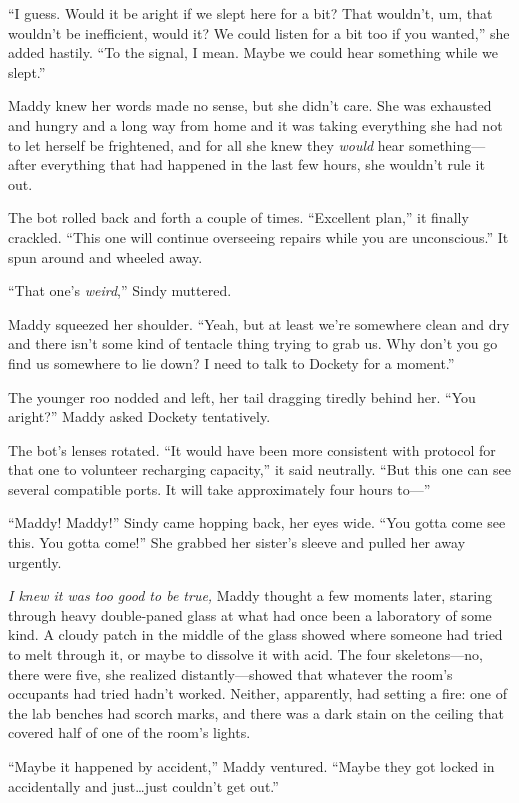 \documentclass[10pt]{article}
\begin{document}
``I guess. Would it be aright if we slept here for a bit? That wouldn't,
um, that wouldn't be inefficient, would it? We could listen for a bit
too if you wanted,'' she added hastily. ``To the signal, I mean. Maybe
we could hear something while we slept.''

Maddy knew her words made no sense, but she didn't care. She was
exhausted and hungry and a long way from home and it was taking
everything she had not to let herself be frightened, and for all she
knew they \emph{would} hear something---after everything that had
happened in the last few hours, she wouldn't rule it out.

The bot rolled back and forth a couple of times. ``Excellent plan,'' it
finally crackled. ``This one will continue overseeing repairs while you
are unconscious.'' It spun around and wheeled away.

``That one's \emph{weird},'' Sindy muttered.

Maddy squeezed her shoulder. ``Yeah, but at least we're somewhere clean
and dry and there isn't some kind of tentacle thing trying to grab us.
Why don't you go find us somewhere to lie down? I need to talk to
Dockety for a moment.''

The younger roo nodded and left, her tail dragging tiredly behind her.
``You aright?'' Maddy asked Dockety tentatively.

The bot's lenses rotated. ``It would have been more consistent with
protocol for that one to volunteer recharging capacity,'' it said
neutrally. ``But this one can see several compatible ports. It will take
approximately four hours to---''

``Maddy! Maddy!'' Sindy came hopping back, her eyes wide. ``You gotta
come see this. You gotta come!'' She grabbed her sister's sleeve and
pulled her away urgently.

\emph{I knew it was too good to be true,} Maddy thought a few moments
later, staring through heavy double-paned glass at what had once been a
laboratory of some kind. A cloudy patch in the middle of the glass
showed where someone had tried to melt through it, or maybe to dissolve
it with acid. The four skeletons---no, there were five, she realized
distantly---showed that whatever the room's occupants had tried hadn't
worked. Neither, apparently, had setting a fire: one of the lab benches
had scorch marks, and there was a dark stain on the ceiling that covered
half of one of the room's lights.

``Maybe it happened by accident,'' Maddy ventured. ``Maybe they got
locked in accidentally and just\ldots{}just couldn't get out.''
\end{document}
